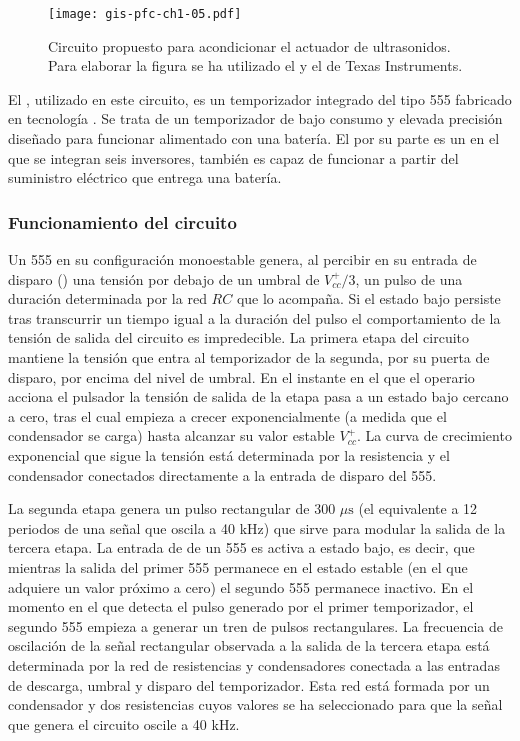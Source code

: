 \begin{sidewaysfigure}[p]
	\begin{center}
		\texttt{[image: gis-pfc-ch1-05.pdf]}
	\end{center}
	\caption[Circuito acondicionador de la sección de emisión]{Circuito
	propuesto para acondicionar el actuador de ultrasonidos. Para
	elaborar la figura se ha utilizado el  y el 
	de Texas Instruments.}
	\label{fig:actuator-conditioner}
\end{sidewaysfigure}

El , utilizado en este circuito, es un temporizador integrado
del tipo 555 fabricado en tecnología . Se trata de un
temporizador de bajo consumo y elevada precisión diseñado para funcionar
alimentado con una batería. El  por su parte es un 
en el que se integran seis inversores, también es capaz de funcionar a
partir del suministro eléctrico que entrega una batería.


\subsubsection{Funcionamiento del circuito}

Un 555 en su configuración monoestable genera, al percibir en su entrada de
disparo () una tensión por debajo de un umbral de $V^+_{cc}/3$,
un pulso de una duración determinada por la red $RC$ que lo acompaña. Si el
estado bajo persiste tras transcurrir un tiempo igual a la duración del
pulso el comportamiento de la tensión de salida del circuito es
impredecible. La primera etapa del circuito mantiene la tensión que entra
al temporizador de la segunda, por su puerta de disparo, por encima del
nivel de umbral. En el instante en el que el operario acciona el pulsador
la tensión de salida de la etapa pasa a un estado bajo cercano a cero, tras
el cual empieza a crecer exponencialmente (a medida que el condensador se
carga) hasta alcanzar su valor estable $V^+_{cc}$. La curva de crecimiento
exponencial que sigue la tensión está determinada por la resistencia y el
condensador conectados directamente a la entrada de disparo del 555.

La segunda etapa genera un pulso rectangular de 300 $\mu\text{s}$ (el
equivalente a 12 periodos de una señal que oscila a 40 kHz) que sirve para
modular la salida de la tercera etapa. La entrada de  de un 555
es activa a estado bajo, es decir, que mientras la salida del primer 555
permanece en el estado estable (en el que adquiere un valor próximo a cero)
el segundo 555 permanece inactivo. En el momento en el que detecta el pulso
generado por el primer temporizador, el segundo 555 empieza a generar un
tren de pulsos rectangulares. La frecuencia de oscilación de la señal
rectangular observada a la salida de la tercera etapa está determinada por
la red de resistencias y condensadores conectada a las entradas de
descarga, umbral y disparo del temporizador. Esta red está formada por un
condensador y dos resistencias cuyos valores se ha seleccionado para que
la señal que genera el circuito oscile a 40 kHz.

